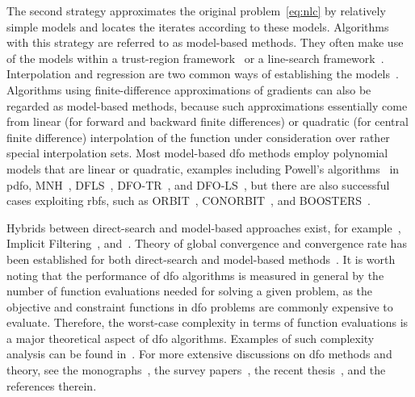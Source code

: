 \documentclass[
    smallextended,  %
    draft,          %
]{svjour3}
\begin{document}
The second strategy approximates the original problem~\eqref{eq:nlc} by relatively simple models and locates the iterates according to these models.
Algorithms with this strategy are referred to as model-based methods. They often make use of the models within a trust-region framework~\cite{Conn_Gould_Toint_2000,Conn_Scheinberg_Vicente_2009a,Yuan_2015} or a line-search framework~\cite{Berahas_Byrd_Nocedal_2019,Shi_Etal_2022}.
Interpolation and regression are two common ways of establishing the models~\cite{Powell_2001,Conn_Scheinberg_Vicente_2008a,Conn_Scheinberg_Vicente_2008b,Wild_Regis_Shoemaker_2008,Bandeira_Scheinberg_Vicente_2012,Billups_Larson_Graf_2013,Regis_Wild_2017}.
Algorithms using finite-difference approximations of gradients can also be regarded as model-based methods, because such approximations essentially come from linear (for forward and backward finite differences) or quadratic (for central finite difference) interpolation of the function under consideration over rather special interpolation sets.
Most model-based \gls{dfo} methods employ polynomial models that are linear or quadratic, examples including
Powell's algorithms~\cite{Powell_1994,Powell_2002,Powell_2006,Powell_2009} in \gls{pdfo},
MNH~\cite{Wild_2008}, DFLS~\cite{Zhang_Conn_Scheinberg_2010},
DFO-TR~\cite{Bandeira_Scheinberg_Vicente_2012}, and DFO-LS~\cite{Cartis_Etal_2019,Hough_Roberts_2022}, but there are also successful cases exploiting \glspl{rbf}, such as ORBIT~\cite{Wild_Regis_Shoemaker_2008}, CONORBIT~\cite{Regis_Wild_2017}, and BOOSTERS~\cite{Oeuvray_Bierlaire_2009}.

Hybrids between direct-search and model-based approaches exist, for example~\cite{Custodio_Vicente_2007}, Implicit Filtering~\cite[Algorithm~4.7]{Kelley_2011}, and~\cite{Conn_Digabel_2013}.
Theory of global convergence and convergence rate has been established for both direct-search and model-based methods~\cite{Torczon_1997,Conn_Scheinberg_Toint_1997a,Kolda_Lewis_Torczon_2003,Conn_Scheinberg_Vicente_2009a,Powell_2012,Vicente_2013,Dodangeh_Vicente_2016,Garmanjani_Judice_Vicente_2016,Gratton_Royer_Vicente_2020}.
It is worth noting that the performance of \gls{dfo} algorithms is measured in general by the number of function evaluations needed for solving a given problem, as the objective and constraint functions in \gls{dfo} problems are commonly
expensive to evaluate.
Therefore, the worst-case complexity in terms of function evaluations is a major theoretical aspect of \gls{dfo} algorithms.
Examples of such complexity analysis can be found in~\cite{Vicente_2013,Gratton_Etal_2015,Dodangeh_Vicente_2016,Dodangeh_Vicente_Zhang_2016}.
For more extensive discussions on \gls{dfo} methods and theory, see the monographs~\cite{Conn_Scheinberg_Vicente_2009b,Audet_Hare_2017}, the survey
papers~\cite{Rios_Sahinidis_2013,Custodio_Scheinberg_Vicente_2017,Larson_Menickelly_Wild_2019}, the recent thesis~\cite{Ragonneau_2022}, and the references therein.
\end{document}
